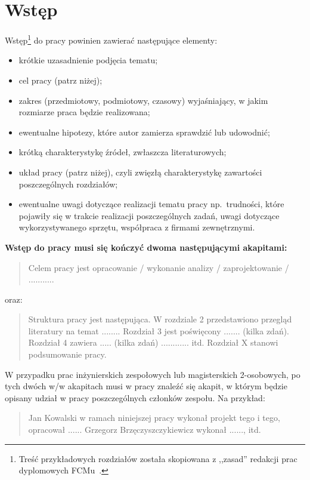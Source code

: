
\chapter{Wstęp}

Wstęp\footnote{Treść przykładowych rozdziałów została skopiowana
z ,,zasad'' redakcji prac dyplomowych FCMu~.} do pracy powinien zawierać następujące elementy:
\begin{itemize}
    \item krótkie uzasadnienie podjęcia tematu; 
    \item cel pracy (patrz niżej); 
    \item zakres (przedmiotowy, podmiotowy, czasowy) wyjaśniający, w jakim rozmiarze praca będzie realizowana; 
    \item ewentualne hipotezy, które autor zamierza sprawdzić lub udowodnić; 
    \item krótką charakterystykę źródeł, zwłaszcza literaturowych; 
    \item układ pracy (patrz niżej), czyli zwięzłą charakterystykę zawartości poszczególnych rozdziałów; 
    \item ewentualne uwagi dotyczące realizacji tematu pracy np.~trudności, które pojawiły się w trakcie 
    realizacji poszczególnych zadań, uwagi dotyczące wykorzystywanego sprzętu, współpraca z firmami zewnętrznymi. 
\end{itemize}

\noindent
\textbf{Wstęp do pracy musi się kończyć dwoma następującymi akapitami:}
\begin{quote}
Celem pracy jest opracowanie / wykonanie analizy / zaprojektowanie / ...........
\end{quote}
oraz:
\begin{quote}
Struktura pracy jest następująca. W rozdziale 2 przedstawiono przegląd literatury na temat ........ 
Rozdział 3 jest poświęcony ....... (kilka zdań). 
Rozdział 4 zawiera ..... (kilka zdań) ............ itd. 
Rozdział X stanowi podsumowanie pracy. 
\end{quote}

W przypadku prac inżynierskich zespołowych lub magisterskich 2-osobowych, po tych dwóch w/w akapitach 
musi w pracy znaleźć się akapit, w którym będzie opisany udział w pracy poszczególnych członków zespołu. Na przykład:

\begin{quote}
Jan Kowalski w ramach niniejszej pracy wykonał projekt tego i tego, opracował ......
Grzegorz Brzęczyszczykiewicz wykonał ......, itd. 
\end{quote}

